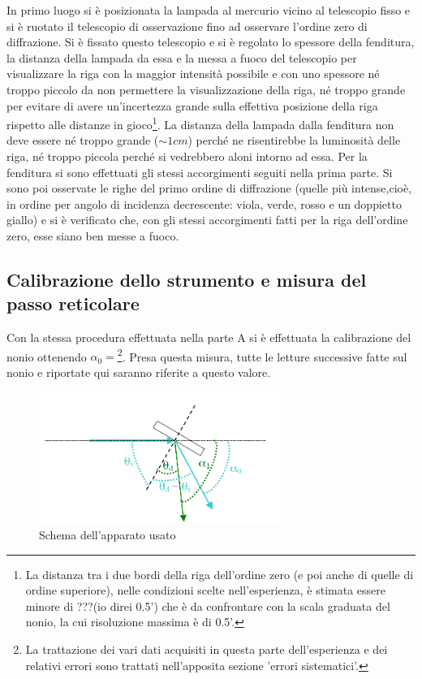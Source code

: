 \documentclass[a4paper,10pt]{article}
\begin{document}
{{{{{{In primo luogo si è posizionata la lampada al mercurio vicino al telescopio fisso e si è ruotato il telescopio di osservazione fino ad osservare l'ordine zero di diffrazione. Si è fissato questo telescopio e si è regolato lo spessore della fenditura, la distanza della lampada da essa e la messa a fuoco del telescopio per visualizzare la riga con la maggior intensità possibile e con uno spessore né troppo piccolo da non permettere la visualizzazione della riga, né troppo grande per evitare di avere un'incertezza grande sulla effettiva posizione della riga rispetto alle distanze in gioco\footnote{La distanza tra i due bordi della riga dell'ordine zero (e poi anche di quelle di ordine superiore), nelle condizioni scelte nell'esperienza, è stimata essere minore di ???(io direi 0.5') che è da confrontare con la scala graduata del nonio, la cui risoluzione massima è di 0.5'.}.
La distanza della lampada dalla fenditura non deve essere né troppo grande ($\sim 1 cm$) perché ne risentirebbe la luminosità delle riga, né troppo piccola perché si vedrebbero aloni intorno ad essa. Per la fenditura si sono effettuati gli stessi accorgimenti seguiti nella prima parte.
Si sono poi osservate le righe del primo ordine di diffrazione (quelle più intense,cioè, in ordine per angolo di incidenza decrescente: viola, verde, rosso e un doppietto giallo) e si è verificato che, con gli stessi accorgimenti fatti per la riga dell'ordine zero, esse siano ben messe a fuoco.


\subsection{Calibrazione dello strumento e misura del passo reticolare}
Con la stessa procedura effettuata nella parte A si è effettuata la calibrazione del nonio ottenendo $\alpha_0 = $\footnote{La trattazione dei vari dati acquisiti in questa parte dell'esperienza e dei relativi errori sono trattati nell'apposita sezione 'errori sistematici'.}. Presa questa misura, tutte le letture successive fatte sul nonio e riportate qui saranno riferite a questo valore.

\begin{figure}[H]
	\centering
	\includegraphics[width=0.7\textwidth]{../grafici/Angoli.png}
	\caption{Schema dell'apparato usato}
	\label{fig:angoli}
\end{figure}

}}}}}}
\end{document}
